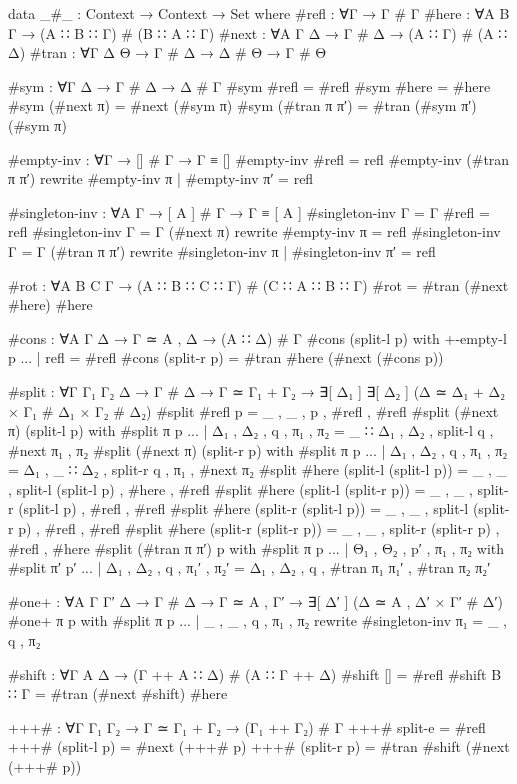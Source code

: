 \begin{code}
data _#_ : Context → Context → Set where
  #refl  : ∀{Γ} → Γ # Γ
  #here  : ∀{A B Γ} → (A ∷ B ∷ Γ) # (B ∷ A ∷ Γ)
  #next  : ∀{A Γ Δ} → Γ # Δ → (A ∷ Γ) # (A ∷ Δ)
  #tran  : ∀{Γ Δ Θ} → Γ # Δ → Δ # Θ → Γ # Θ

#sym : ∀{Γ Δ} → Γ # Δ → Δ # Γ
#sym #refl = #refl
#sym #here = #here
#sym (#next π) = #next (#sym π)
#sym (#tran π π′) = #tran (#sym π′) (#sym π)

#empty-inv : ∀{Γ} → [] # Γ → Γ ≡ []
#empty-inv #refl = refl
#empty-inv (#tran π π′) rewrite #empty-inv π | #empty-inv π′ = refl

#singleton-inv : ∀{A Γ} → [ A ] # Γ → Γ ≡ [ A ]
#singleton-inv {Γ = Γ} #refl = refl
#singleton-inv {Γ = Γ} (#next π) rewrite #empty-inv π = refl
#singleton-inv {Γ = Γ} (#tran π π′) rewrite #singleton-inv π | #singleton-inv π′ = refl

#rot : ∀{A B C Γ} → (A ∷ B ∷ C ∷ Γ) # (C ∷ A ∷ B ∷ Γ)
#rot = #tran (#next #here) #here

#cons : ∀{A Γ Δ} → Γ ≃ A , Δ → (A ∷ Δ) # Γ
#cons (split-l p) with +-empty-l p
... | refl = #refl
#cons (split-r p) = #tran #here (#next (#cons p))

#split : ∀{Γ Γ₁ Γ₂ Δ} → Γ # Δ → Γ ≃ Γ₁ + Γ₂ → ∃[ Δ₁ ] ∃[ Δ₂ ] (Δ ≃ Δ₁ + Δ₂ × Γ₁ # Δ₁ × Γ₂ # Δ₂)
#split #refl p = _ , _ , p , #refl , #refl
#split (#next π) (split-l p) with #split π p
... | Δ₁ , Δ₂ , q , π₁ , π₂ = _ ∷ Δ₁ , Δ₂ , split-l q , #next π₁ , π₂
#split (#next π) (split-r p) with #split π p
... | Δ₁ , Δ₂ , q , π₁ , π₂ = Δ₁ , _ ∷ Δ₂ , split-r q , π₁ , #next π₂
#split #here (split-l (split-l p)) = _ , _ , split-l (split-l p) , #here , #refl
#split #here (split-l (split-r p)) = _ , _ , split-r (split-l p) , #refl , #refl
#split #here (split-r (split-l p)) = _ , _ , split-l (split-r p) , #refl , #refl
#split #here (split-r (split-r p)) = _ , _ , split-r (split-r p) , #refl , #here
#split (#tran π π′) p with #split π p
... | Θ₁ , Θ₂ , p′ , π₁ , π₂ with #split π′ p′
... | Δ₁ , Δ₂ , q , π₁′ , π₂′ = Δ₁ , Δ₂ , q , #tran π₁ π₁′ , #tran π₂ π₂′

#one+ : ∀{A Γ Γ′ Δ} → Γ # Δ → Γ ≃ A , Γ′ → ∃[ Δ′ ] (Δ ≃ A , Δ′ × Γ′ # Δ′)
#one+ π p with #split π p
... | _ , _ , q , π₁ , π₂ rewrite #singleton-inv π₁ = _ , q , π₂

#shift : ∀{Γ A Δ} → (Γ ++ A ∷ Δ) # (A ∷ Γ ++ Δ)
#shift {[]} = #refl
#shift {B ∷ Γ} = #tran (#next #shift) #here

+++# : ∀{Γ Γ₁ Γ₂} → Γ ≃ Γ₁ + Γ₂ → (Γ₁ ++ Γ₂) # Γ
+++# split-e = #refl
+++# (split-l p) = #next (+++# p)
+++# (split-r p) = #tran #shift (#next (+++# p))


\end{code}
